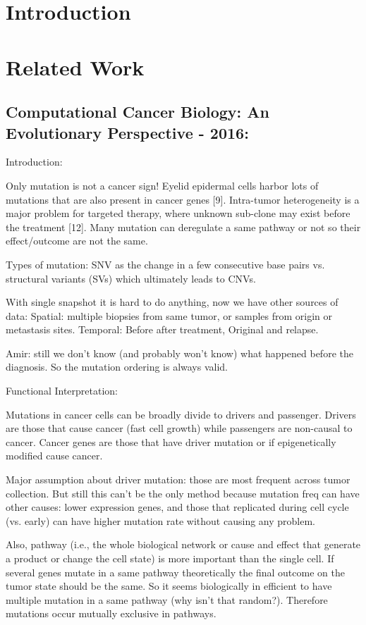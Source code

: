 \section{Introduction}
	
	
	\section{Related Work}
	\subsection{Computational Cancer Biology: An Evolutionary Perspective - 2016:}
	
	Introduction:
	
	Only mutation is not a cancer sign! Eyelid epidermal cells harbor lots of mutations that are also present in cancer genes [9].
	Intra-tumor heterogeneity is a major problem for targeted therapy, where unknown sub-clone may exist before the treatment [12].
	Many mutation can deregulate a same pathway or not so their effect/outcome are not the same.
	
	Types of mutation: SNV as the change in a few consecutive base pairs vs. structural variants (SVs) which ultimately leads to CNVs. 
	
	With single snapshot it is hard to do anything, now we have other sources of data:
	Spatial: multiple biopsies from same tumor, or samples from origin or metastasis sites. 
	Temporal: Before after treatment, Original and relapse. 
	
	Amir: still we don't know (and probably won't know) what happened before the diagnosis. So the mutation ordering is always valid. 
	
	Functional Interpretation:
	
	Mutations in cancer cells can be broadly divide to drivers and passenger. 
	Drivers are those that cause cancer (fast cell growth) while passengers are non-causal to cancer. 
	Cancer genes are those that have driver mutation or if epigenetically modified cause cancer. 
	
	Major assumption about driver mutation: those are most frequent across tumor collection. 
	But still this can't be the only method because mutation freq can have other causes:
	lower expression genes, and those that replicated during cell cycle (vs. early) can have higher mutation rate without causing any problem. 
	
	Also, pathway (i.e., the whole biological network or cause and effect that generate a product or change the cell state) is more important than the single cell. 
	If several genes mutate in a same pathway theoretically the final outcome on the tumor state should be the same. 
	So it seems biologically in efficient to have multiple mutation in a same pathway (why isn't that random?). 
	Therefore mutations occur mutually exclusive in pathways. 
	
